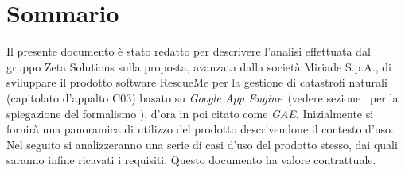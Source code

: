 
\section*{Sommario}

Il presente documento è stato redatto per descrivere l'analisi effettuata dal gruppo Zeta Solutions sulla proposta, avanzata dalla società Miriade S.p.A., di sviluppare il prodotto software RescueMe per la gestione di catastrofi naturali (capitolato d'appalto C03) basato su \textit{Google App Engine}\GL\ (vedere sezione \ per la spiegazione del formalismo \GL), d'ora in poi citato come \textit{GAE}. 
\newline Inizialmente si fornirà una panoramica di utilizzo del prodotto descrivendone il contesto d'uso. Nel seguito si analizzeranno una serie di casi d'uso del prodotto stesso, dai quali saranno infine ricavati i requisiti.
\newline Questo documento ha valore contrattuale.
\pagebreak

